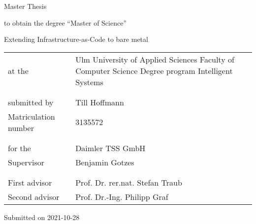 \begin{titlepage}
  \vspace*{4cm}

  {\normalfont\sffamily\huge Master Thesis}

  \vspace{0.5cm}
  to obtain the degree \enquote{Master of Science}

  \vspace{2.0cm}
  {\normalfont\sffamily\large Extending Infrastructure-as-Code to bare metal}

  \bigskip

  \begin{tabular}{ @{} p{} p{} }
      at the & Ulm University of Applied Sciences
      \newline
      Faculty of Computer Science
      \newline
      Degree program Intelligent Systems  \\
      & \\
      & \\
      submitted by & Till Hoffmann \\
      Matriculation number & 3135572 \\
      & \\
      & \\
      for the & Daimler TSS GmbH \\
      Supervisor & Benjamin Gotzes \\
      & \\
      & \\
      First advisor & Prof. Dr. rer.nat. Stefan Traub \\
      Second advisor & Prof. Dr.-Ing. Philipp Graf \\
  \end{tabular}

  \vspace{1cm}
  
  Submitted on 2021-10-28

\end{titlepage}
